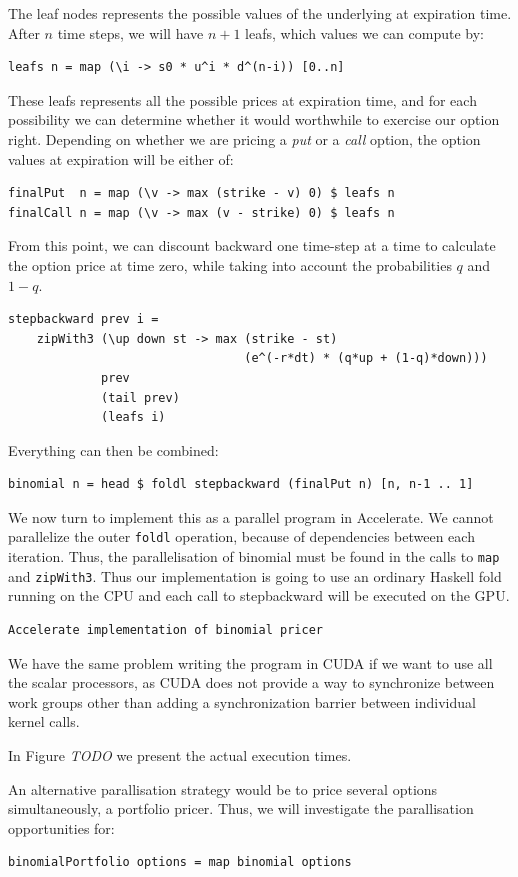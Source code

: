 \documentclass{llncs2e/llncs}
\begin{document}
The leaf nodes represents the possible values of the underlying at
expiration time. After $n$ time steps, we will have $n+1$ leafs, which
values we can compute by:
\begin{verbatim}
leafs n = map (\i -> s0 * u^i * d^(n-i)) [0..n]
\end{verbatim}
These leafs represents all the possible prices at expiration time, and
for each possibility we can determine whether it would worthwhile to
exercise our option right. Depending on whether we are pricing a
\emph{put} or a \emph{call} option, the option values at expiration
will be either of:
\begin{verbatim}
finalPut  n = map (\v -> max (strike - v) 0) $ leafs n
finalCall n = map (\v -> max (v - strike) 0) $ leafs n
\end{verbatim}
From this point, we can discount backward one time-step at a time to
calculate the option price at time zero, while taking into account the
probabilities $q$ and $1-q$.
\begin{verbatim}
stepbackward prev i =
    zipWith3 (\up down st -> max (strike - st) 
                                 (e^(-r*dt) * (q*up + (1-q)*down)))
             prev
             (tail prev)
             (leafs i)
\end{verbatim}
Everything can then be combined:
\begin{verbatim}
binomial n = head $ foldl stepbackward (finalPut n) [n, n-1 .. 1]
\end{verbatim}

We now turn to implement this as a parallel program in Accelerate. We
cannot parallelize the outer \verb|foldl| operation, because of
dependencies between each iteration. Thus, the parallelisation of
binomial must be found in the calls to \verb|map| and
\verb|zipWith3|. Thus our implementation is going to use an ordinary
Haskell fold running on the CPU and each call to stepbackward will be
executed on the GPU.
\begin{verbatim}
Accelerate implementation of binomial pricer
\end{verbatim}
We have the same problem writing the program in CUDA if we want to use
all the scalar processors, as CUDA does not provide a way to
synchronize between work groups other than adding a synchronization
barrier between individual kernel calls.

In Figure \emph{TODO} we present the actual execution times.

An alternative parallisation strategy would be to price several
options simultaneously, a portfolio pricer. Thus, we will investigate
the parallisation opportunities for:
\begin{verbatim}
binomialPortfolio options = map binomial options
\end{verbatim}
\end{document}
